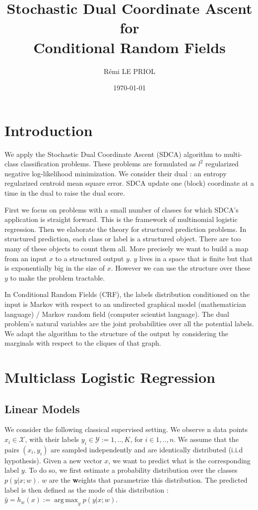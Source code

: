 \documentclass{article}
\title{Stochastic Dual Coordinate Ascent \\ for \\ Conditional Random Fields}
\author{R\'emi LE PRIOL}
\date{\today}
\DeclareMathOperator{\1}{\mathbb{1}}
\DeclareMathOperator*{\argmax}{arg\,max}
\begin{document}
\maketitle

\section*{Introduction}

We apply the Stochastic Dual Coordinate Ascent (SDCA) algorithm to multi-class classification problems.
These problems are formulated as $l^2$ regularized negative log-likelihood minimization. 
We consider their dual : an entropy regularized centroid mean square error.
SDCA update one (block) coordinate at a time in the dual to raise the dual score.
  
First we focus on problems with a small number of classes for which SDCA's application is straight forward.
This is the framework of multinomial logistic regression.
Then we elaborate the theory for structured prediction problems.
In structured prediction, each class or label is a structured object.
There are too many of these objects to count them all.
More precisely we want to build a map from an input $x$ to a structured output $y$.
$y$ lives in a space that is finite but that is exponentially big in the size of $x$.
However we can use the structure over these $y$ to make the problem tractable.

In Conditional Random Fields (CRF), the labels distribution conditioned on the input is Markov with respect to an undirected graphical model (mathematician language) / Markov random field (computer scientist language). 
The dual problem's natural variables are the joint probabilities over all the potential labels.
We adapt the algorithm to the structure of the output by considering the marginals with respect to the cliques of that graph.

\tableofcontents

\section{Multiclass Logistic Regression}

\subsection{Linear Models}

We consider the following classical supervised setting.
We observe n data points $x_i \in \mathcal{X}$, with their labels $y_i\in \mathcal{Y}:={1,..,K}$, for $i \in {1,..,n}$.
We assume that the pairs $(x_i, y_i)$ are sampled independently and are identically distributed (i.i.d hypothesis).
Given a new vector $x$, we want to predict what is the corresponding label $y$. 
To do so, we first estimate a probability distribution over the classes $p(y|x ; w)$.
$w$ are the \textbf{w}eights that parametrize this distribution. 
The predicted label is then defined as the mode of this distribution : $\hat y = h_w(x) := \argmax_y p(y| x ; w)$.
\end{document}
